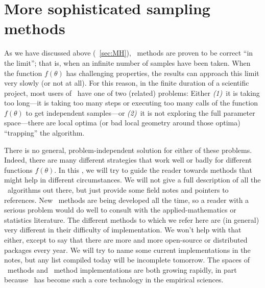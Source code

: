 \documentclass[modern]{aastex61}
\newcommand{\MCMC}{\acronym{MCMC}}
\newcommand{\pars}{\theta}
\begin{document}
\section{More sophisticated sampling methods}\label{sec:methods}

As we have discussed above (\sectionname~\ref{sec:MH}),
\MCMC\ methods are proven to be correct ``in the limit''; that is, when
an infinite number of samples have been taken.
When the function $f(\pars)$ has challenging properties, the results
can approach this limit very slowly (or not at all).
For this reason, in the finite duration of a scientific project, most
users of \MCMC\ have one of two (related) problems:
Either \textsl{(1)}~it is taking too long---it is taking too many steps or
executing too many calls of the function $f(\pars)$ to get independent
samples---or \textsl{(2)}~it is not
exploring the full parameter space---there are local optima (or bad
local geometry around those optima) ``trapping'' the algorithm.

There is no general, problem-independent solution for either of these
problems.
Indeed, there are many different strategies that work well or badly
for different functions $f(\pars)$.
In this \sectionname, we will try to guide the reader towards methods
that might help in different circumstances.
We will not give a full description of all the \MCMC\ algorithms out
there, but just provide some field notes and pointers to references.
New \MCMC\ methods are being developed all the time, so a reader with a
serious problem would do well to consult with the applied-mathematics
or statistics literature.
The different methods to which we refer here are (in general) very
different in their difficulty of implementation.
We won't help with that either, except to say that there are more and
more open-source or distributed packages every year.
We will try to name some current implementations in the notes, but any
list compiled today will be incomplete tomorrow.
The spaces of \MCMC\ methods and \MCMC\ method implementations are both
growing rapidly, in part because \MCMC\ has become such a core
technology in the empirical sciences.
\end{document}
